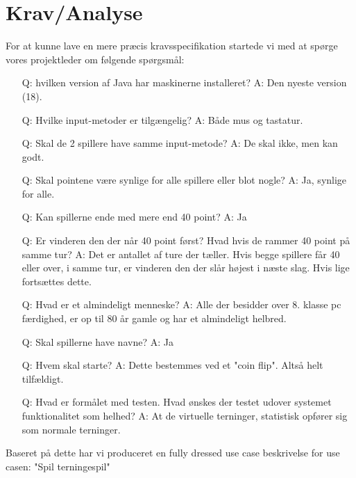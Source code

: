 \documentclass{article}
\begin{document}
\section{Krav/Analyse}
For at kunne lave en mere præcis kravsspecifikation startede vi med at spørge vores projektleder om følgende spørgsmål:
\begin{itemize}
    \item [Q:] hvilken version af Java har maskinerne installeret?
            \subitem A: Den nyeste version (18).
    \item [Q:]Hvilke input-metoder er tilgængelig?
            \subitem A: Både mus og tastatur.
    \item [Q:]Skal de 2 spillere have samme input-metode?
            \subitem A: De skal ikke, men kan godt.
    \item [Q:]Skal pointene være synlige for alle spillere eller blot nogle?
            \subitem A: Ja, synlige for alle.
    \item [Q:]Kan spillerne ende med mere end 40 point?
            \subitem A: Ja
    \item [Q:]Er vinderen den der når 40 point først? Hvad hvis de rammer 40 point på samme tur?
            \subitem A: Det er antallet af ture der tæller. Hvis begge spillere får 40 eller over, i samme tur, er vinderen den der slår højest i næste slag. Hvis lige fortsættes dette.
    \item [Q:]Hvad er et almindeligt menneske?
            \subitem A: Alle der besidder over 8. klasse pc færdighed, er op til 80 år gamle og har et almindeligt helbred.
    \item [Q:] Skal spillerne have navne?
            \subitem A: Ja
    \item [Q:]Hvem skal starte?
            \subitem A: Dette bestemmes ved et "coin flip". Altså helt tilfældigt.
    \item [Q:]Hvad er formålet med testen. Hvad ønskes der testet udover systemet funktionalitet som helhed?
        \subitem A: At de virtuelle terninger, statistisk opfører sig som normale terninger.
\end{itemize}

\noindent Baseret på dette har vi produceret en fully dressed use case beskrivelse for use casen: "Spil terningespil"
\end{document}
